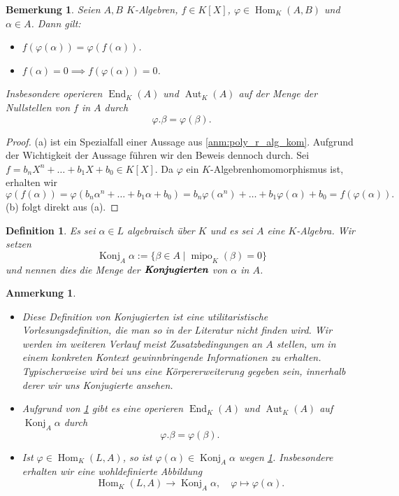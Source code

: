 \documentclass[a4paper, twoside, 11pt, ngerman]{report}
\DeclareMathOperator{\Aut}{Aut}
\DeclareMathOperator{\End}{End}
\DeclareMathOperator{\Hom}{Hom}
\DeclareMathOperator{\Konj}{Konj}
\DeclareMathOperator{\mipo}{mipo}
\theoremstyle{definistyle}
\newtheorem{defini}[satz]{Definition}
\newtheorem{bem}[satz]{Bemerkung}
\newtheorem{anm}[satz]{Anmerkung}
\theoremstyle{remark}
\newcommand{\defn}[1]{\textit{\bfseries #1}}
\begin{document}
\begin{bem}\label{bem:k-algebra_homomorphismen}
Seien $A, B$ $K$-Algebren, $f \in K[X]$, $\varphi \in \Hom_K(A, B)$ und $\alpha \in A$. Dann gilt:
\begin{itemize}
    \item[(a)] $f(\varphi(\alpha)) = \varphi(f(\alpha))$.
    \item[(b)] $f(\alpha) = 0 \implies f(\varphi(\alpha)) = 0$.
\end{itemize}
Insbesondere operieren $\End_K(A)$ und $\Aut_K(A)$ auf der Menge der Nullstellen von $f$ in $A$ durch \[\varphi.\beta=\varphi(\beta).\]
\end{bem}

\begin{proof}
(a) ist ein Spezialfall einer Aussage aus \ref{anm:poly_r_alg_kom}. Aufgrund der Wichtigkeit der Aussage führen wir den Beweis dennoch durch. Sei $f=b_nX^n+\ldots+b_1X+b_0\in K[X]$. Da $\varphi$ ein $K$-Algebrenhomomorphismus ist, erhalten wir
\[
\varphi(f(\alpha))=\varphi(b_n\alpha^n+\ldots+b_1\alpha+b_0)=b_n\varphi(\alpha^n)+\ldots+
b_1\varphi(\alpha)+b_0=f(\varphi(\alpha)).
\]
(b) folgt direkt aus (a).
\end{proof}

\begin{defini}\label{def:konjugierte}
Es sei $\alpha\in L$ algebraisch über $K$ und es sei $A$ eine $K$-Algebra.
Wir setzen
\[
\Konj_A\alpha:=\{ \beta\in A \mid \mipo_K(\beta) = 0\}
\]
und nennen dies die Menge der $\defn{Konjugierten}$ von $\alpha$ in $A$.
\end{defini}

\begin{anm}\label{anm:konjugierte}
\begin{itemize}
\item Diese Definition von Konjugierten ist eine utilitaristische Vorlesungsdefinition, die man so in der Literatur nicht finden wird. Wir werden im weiteren Verlauf meist Zusatzbedingungen an $A$ stellen, um in einem konkreten Kontext gewinnbringende Informationen zu erhalten. Typischerweise wird bei uns eine Körpererweiterung gegeben sein, innerhalb derer wir uns Konjugierte ansehen.
\item Aufgrund von \ref{bem:k-algebra_homomorphismen} gibt es eine operieren $\End_K(A)$ und $\Aut_K(A)$ auf $\Konj_A\alpha$ durch
\[\varphi.\beta=\varphi(\beta).\]
\item Ist $\varphi\in\Hom_K(L,A)$, so ist $\varphi(\alpha)\in\Konj_A\alpha$ wegen \ref{bem:k-algebra_homomorphismen}. Insbesondere erhalten wir eine wohldefinierte Abbildung
\[
\Hom_K(L,A)\to \Konj_A\alpha, \quad \varphi\mapsto\varphi(\alpha).
\]
\end{itemize}
\end{anm}
\end{document}
